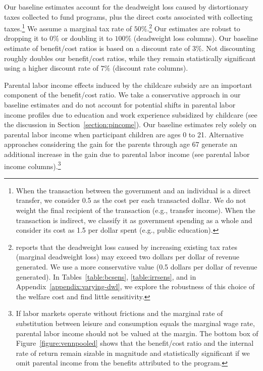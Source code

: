 Our baseline estimates account for the deadweight loss caused by distortionary taxes collected to fund programs, plus the direct costs associated with collecting taxes.\footnote{When the transaction between the government and an individual is a direct transfer, we consider 0.5 as the cost per each transacted dollar. We do not weight the final recipient of the transaction (e.g., transfer income). When the transaction is indirect, we classify it as government spending as a whole and consider its cost as 1.5 per dollar spent (e.g., public education).} We assume a marginal tax rate of $50\%$.\footnote{\citet{Feldstein_1999_REStat} reports that the deadweight loss caused by increasing existing tax rates (marginal deadweight loss) may exceed two dollars per dollar of revenue generated. We use a more conservative value (0.5 dollars per dollar of revenue generated). In Tables~\ref{table:bcsens}, \ref{table:irrsens}, and in  Appendix~\ref{appendix:varying-dwl}, we explore the robustness of this choice of the welfare cost and find little sensitivity.} Our estimates are robust to dropping it to $0\%$ or doubling it to $100\%$ (deadweight loss columns). Our baseline estimate of benefit/cost ratios is based on a discount rate of $3\%$. Not discounting roughly doubles our benefit/cost ratios, while they remain statistically significant using a higher discount rate of $7\%$ (discount rate columns).

Parental labor income effects induced by the childcare subsidy are an important component of the benefit/cost ratio. We take a conservative approach in our baseline estimates and do not account for potential shifts in parental labor income profiles due to education and work experience subsidized by childcare (see the discussion in Section~\ref{section:pincome}). Our baseline estimates rely solely on parental labor income when participant children are ages 0 to 21. Alternative approaches considering the gain for the parents through age 67 generate an additional increase in the gain due to parental labor income (see parental labor income columns).\footnote{If labor markets operate without frictions and the marginal rate of substitution between leisure and consumption equals the marginal wage rate, parental labor income should not be valued at the margin. The bottom box of Figure~\ref{figure:vennpooled} shows that the benefit/cost ratio and the internal rate of return remain sizable in magnitude and statistically significant if we omit parental income from the benefits attributed to the program.}

